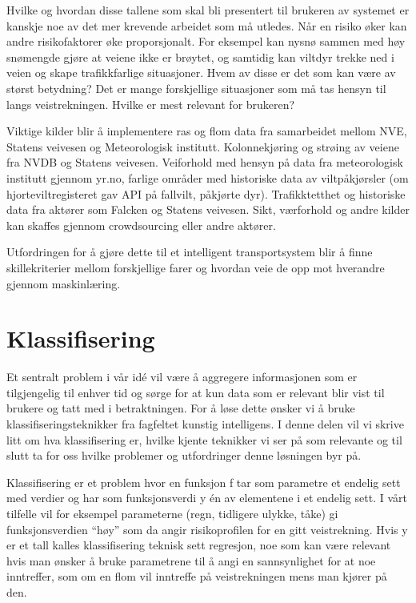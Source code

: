 \documentclass[a4paper,norsk,oneside]{book}
\begin{document}
Hvilke og hvordan disse tallene som skal bli presentert til brukeren av systemet er kanskje noe av det mer krevende arbeidet som må utledes. Når en risiko øker kan andre risikofaktorer øke proporsjonalt. For eksempel kan nysnø sammen med høy snømengde gjøre at veiene ikke er brøytet, og samtidig kan viltdyr trekke ned i veien og skape trafikkfarlige situasjoner. Hvem av disse er det som kan være av størst betydning? Det er mange forskjellige situasjoner som må tas hensyn til langs veistrekningen. Hvilke er mest relevant for brukeren?

Viktige kilder blir å implementere ras og flom data fra samarbeidet mellom NVE, Statens veivesen og Meteorologisk institutt. Kolonnekjøring og strøing av veiene fra NVDB og Statens veivesen. Veiforhold med hensyn på data fra meteorologisk institutt gjennom yr.no, farlige områder med historiske data av viltpåkjørsler (om hjorteviltregisteret gav API på fallvilt, påkjørte dyr). Trafikktetthet og historiske data fra aktører som Falcken og Statens veivesen. Sikt, værforhold og andre kilder kan skaffes gjennom crowdsourcing eller andre aktører.

Utfordringen for å gjøre dette til et intelligent transportsystem blir å finne skillekriterier mellom forskjellige farer og hvordan veie de opp mot hverandre gjennom maskinlæring.

\section{Klassifisering}
\label{sec:klassifisering}

Et sentralt problem i vår idé vil være å aggregere informasjonen som er tilgjengelig til enhver tid og sørge for at kun data som er relevant blir vist til brukere og tatt med i betraktningen.  For å løse dette ønsker vi å bruke klassifiseringsteknikker fra fagfeltet kunstig intelligens. I denne delen vil vi skrive litt om hva klassifisering er, hvilke kjente teknikker vi ser på som relevante og til slutt ta for oss hvilke problemer og utfordringer denne løsningen byr på.

Klassifisering er et problem hvor en funksjon f tar som parametre et endelig sett med verdier og har som funksjonsverdi y én av elementene i et endelig sett.\cite{norvig} I vårt tilfelle vil for eksempel parameterne (regn, tidligere ulykke, tåke) gi funksjonsverdien “høy” som da angir risikoprofilen for en gitt veistrekning. Hvis y er et tall kalles klassifisering teknisk sett regresjon, noe som kan være relevant hvis man ønsker å bruke parametrene til å angi en sannsynlighet for at noe inntreffer, som om en flom vil inntreffe på veistrekningen mens man kjører på den.
\end{document}
